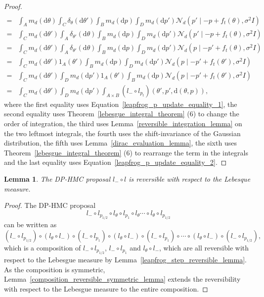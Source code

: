 \documentclass[english,twoside,openright]{HYgraduMLDS}
\newtheorem{lemma}{Lemma}[chapter]
\newcommand{\dx}{\mathrm{d}}
\newcommand{\caln}{{\mathcal{N}}}
\begin{document}
\begin{proof}
\begin{align*}
    \\=& \int_{A}m_{d}(\dx \theta)\int_{C}\delta_{\theta}(\dx \theta')\int_{B}m_{d}(\dx p)
         \int_{D}m_{d}(\dx p') \caln_{d}(p'\mid -p + f_{t}(\theta), \sigma^{2}I)
    \\=& \int_{C}m_{d}(\dx \theta')\int_{A}\delta_{\theta'}(\dx \theta)\int_{B}m_{d}(\dx p)
         \int_{D}m_{d}(\dx p') \caln_{d}(p'\mid -p + f_{t}(\theta), \sigma^{2}I)
    \\=& \int_{C}m_{d}(\dx \theta')\int_{A}\delta_{\theta'}(\dx \theta)\int_{B}m_{d}(\dx p)
         \int_{D}m_{d}(\dx p') \caln_{d}(p\mid -p' + f_{t}(\theta), \sigma^{2}I)
    \\=& \int_{C}m_{d}(\dx \theta')1_{A}(\theta')\int_{B}m_{d}(\dx p)
         \int_{D}m_{d}(\dx p') \caln_{d}(p\mid -p' + f_{t}(\theta'), \sigma^{2}I)
    \\=& \int_{C}m_{d}(\dx \theta')\int_{D}m_{d}(\dx p')1_{A}(\theta')
         \int_{B}m_{d}(\dx p)\caln_{d}(p\mid -p' + f_{t}(\theta'), \sigma^{2}I)
    \\=& \int_{C}m_{d}(\dx\theta')\int_{D}m_{d}(\dx p')
         \int_{A\times B}(l_{-}\circ l_{p_{t}})(\theta', p', \dx(\theta, p)),
  \end{align*}
  where the first equality uses Equation~\ref{leapfrog_p_update_equality_1},
  the second equality uses Theorem~\ref{lebesgue_integral_theorem} (6)
  to change the order of integration,
  the third uses Lemma~\ref{reversible_integration_lemma} on the two leftmost
  integrals,
  the fourth uses the shift-invariance of the Gaussian distribution,
  the fifth uses Lemma~\ref{dirac_evaluation_lemma},
  the sixth uses Theorem~\ref{lebesgue_integral_theorem} (6) to rearrange the
  term in the integrals and the last equality uses
  Equation~\ref{leapfrog_p_update_equality_2}.
\end{proof}

\begin{lemma}\label{leapfrog_reversibility_lemma}
	The DP-HMC proposal \(l_{-} \circ l\) is reversible with respect
  to the Lebesque measure.
\end{lemma}
\begin{proof}
  The DP-HMC proposal
  \[
    l_{-}\circ l_{p_{1/2}}\circ l_{\theta}\circ l_{p_{1}}\circ l_{\theta}
    \dotsb \circ l_{\theta}\circ l_{p_{1/2}}
  \]
  can be written as
  \[
    (l_{-}\circ l_{p_{1/2}})\circ (l_{\theta} \circ l_{-})\circ (l_{-}\circ l_{p_{1}})
    \circ (l_{\theta} \circ l_{-}) \circ (l_{-} \circ l_{p_{1}})\circ
    \dotsb \circ (l_{\theta}\circ l_{-})\circ (l_{-}\circ l_{p_{1/2}}),
  \]
  which is a composition of \(l_{-}\circ l_{p_{1/2}}\), \(l_{-}\circ l_{p_{1}}\)
  and \(l_{\theta}\circ l_{-}\), which are all reversible with respect to the
  Lebesgue measure by Lemma~\ref{leapfrog_step_reversible_lemma}.
  As the composition is symmetric,
  Lemma~\ref{composition_reversible_symmetric_lemma} extends the reversibility
  with respect to the Lebesgue measure to the entire composition.
\end{proof}
\end{document}
